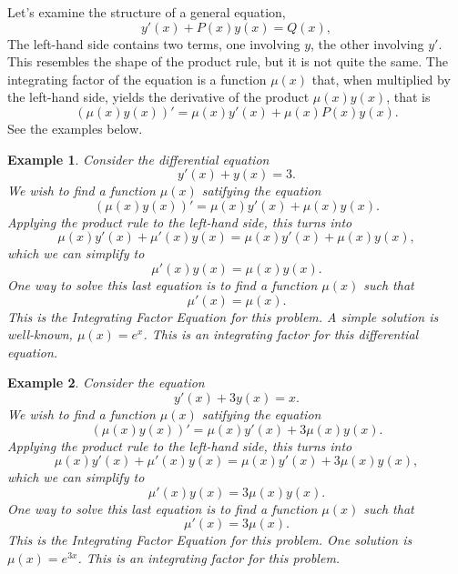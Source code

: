 \documentclass[11pt]{amsart}
\newtheorem{example}{Example}[section]
\numberwithin{equation}{section}
\begin{document}
Let's examine the structure of a general equation, 
\begin{equation*}
y'(x)+P(x)y(x)=Q(x),
\end{equation*}
The left-hand side contains two terms, one involving $y$, the other involving $y'$. This resembles the shape of the product rule, but it is not quite the same. The integrating factor of the equation is a function $\mu(x)$ that, when multiplied by the left-hand side, yields the derivative of the product $\mu(x)y(x)$, that is
\begin{equation*}
(\mu(x)y(x))'=\mu(x)y'(x)+\mu(x)P(x)y(x).
\end{equation*}
See the examples below.

\begin{example}
Consider the differential equation 
\begin{equation}
\label{example1}
y'(x)+y(x)=3.
\end{equation}
We wish to find a function $\mu(x)$ satifying the equation
\begin{equation*}
(\mu(x) y(x))'= \mu(x)y'(x)+\mu(x)y(x).
\end{equation*}
Applying the product rule to the left-hand side, this turns into
\begin{equation*}
\mu(x)y'(x)+\mu'(x)y(x)= \mu(x)y'(x) + \mu(x)y(x),
\end{equation*}
which we can simplify to 
\begin{equation*}
\mu'(x)y(x)=\mu(x)y(x).
\end{equation*}
One way to solve this last equation is to find a function $\mu(x)$ such that 
\begin{equation*}
\mu'(x)=\mu(x).
\end{equation*}
This is the \textit{Integrating Factor Equation} for this problem. A simple solution is well-known, $\mu(x)=e^x$. This is an \textit{integrating factor} for this differential equation. 
\end{example}

\begin{example}
Consider the equation
\begin{equation}
\label{example2}
y'(x)+3y(x)=x.
\end{equation}
We wish to find a function $\mu(x)$ satifying the equation
\begin{equation*}
(\mu(x) y(x))'= \mu(x)y'(x)+3\mu(x)y(x).
\end{equation*}
Applying the product rule to the left-hand side, this turns into
\begin{equation*}
\mu(x)y'(x)+\mu'(x)y(x)= \mu(x)y'(x) + 3\mu(x)y(x),
\end{equation*}
which we can simplify to 
\begin{equation*}
\mu'(x)y(x)=3\mu(x)y(x).
\end{equation*}
One way to solve this last equation is to find a function $\mu(x)$ such that 
\begin{equation*}
\mu'(x)=3\mu(x).
\end{equation*}
This is the \textit{Integrating Factor Equation} for this problem. One solution is $\mu(x)=e^{3x}$. This is an integrating factor for this problem. 
\end{example}
\end{document}
